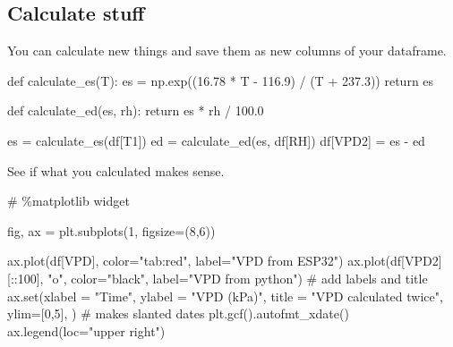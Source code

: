 \documentclass[
  letterpaper,
  DIV=11,
  numbers=noendperiod,
  oneside]{scrreprt}
\newenvironment{Shaded}{\begin{snugshade}}{\end{snugshade}}
\newcommand{\BuiltInTok}[1]{\textcolor[rgb]{0.00,0.23,0.31}{#1}}
\newcommand{\CommentTok}[1]{\textcolor[rgb]{0.37,0.37,0.37}{#1}}
\newcommand{\ControlFlowTok}[1]{\textcolor[rgb]{0.00,0.23,0.31}{#1}}
\newcommand{\DecValTok}[1]{\textcolor[rgb]{0.68,0.00,0.00}{#1}}
\newcommand{\FloatTok}[1]{\textcolor[rgb]{0.68,0.00,0.00}{#1}}
\newcommand{\KeywordTok}[1]{\textcolor[rgb]{0.00,0.23,0.31}{#1}}
\newcommand{\NormalTok}[1]{\textcolor[rgb]{0.00,0.23,0.31}{#1}}
\newcommand{\OperatorTok}[1]{\textcolor[rgb]{0.37,0.37,0.37}{#1}}
\newcommand{\StringTok}[1]{\textcolor[rgb]{0.13,0.47,0.30}{#1}}
\begin{document}
\hypertarget{calculate-stuff}{%
\subsection{Calculate stuff}\label{calculate-stuff}}

You can calculate new things and save them as new columns of your
dataframe.

\begin{Shaded}
\begin{Highlighting}[]
\KeywordTok{def}\NormalTok{ calculate\_es(T):}
\NormalTok{    es }\OperatorTok{=}\NormalTok{ np.exp((}\FloatTok{16.78} \OperatorTok{*}\NormalTok{ T }\OperatorTok{{-}} \FloatTok{116.9}\NormalTok{) }\OperatorTok{/}\NormalTok{ (T }\OperatorTok{+} \FloatTok{237.3}\NormalTok{))}
    \ControlFlowTok{return}\NormalTok{ es}

\KeywordTok{def}\NormalTok{ calculate\_ed(es, rh):}
    \ControlFlowTok{return}\NormalTok{ es }\OperatorTok{*}\NormalTok{ rh }\OperatorTok{/} \FloatTok{100.0}

\NormalTok{es }\OperatorTok{=}\NormalTok{ calculate\_es(df[}\StringTok{\textquotesingle{}T1\textquotesingle{}}\NormalTok{])}
\NormalTok{ed }\OperatorTok{=}\NormalTok{ calculate\_ed(es, df[}\StringTok{\textquotesingle{}RH\textquotesingle{}}\NormalTok{])}
\NormalTok{df[}\StringTok{\textquotesingle{}VPD2\textquotesingle{}}\NormalTok{] }\OperatorTok{=}\NormalTok{ es }\OperatorTok{{-}}\NormalTok{ ed}
\end{Highlighting}
\end{Shaded}

See if what you calculated makes sense.

\begin{Shaded}
\begin{Highlighting}[]
\CommentTok{\# \%matplotlib widget}

\NormalTok{fig, ax }\OperatorTok{=}\NormalTok{ plt.subplots(}\DecValTok{1}\NormalTok{, figsize}\OperatorTok{=}\NormalTok{(}\DecValTok{8}\NormalTok{,}\DecValTok{6}\NormalTok{))}

\NormalTok{ax.plot(df[}\StringTok{\textquotesingle{}VPD\textquotesingle{}}\NormalTok{], color}\OperatorTok{=}\StringTok{"tab:red"}\NormalTok{, label}\OperatorTok{=}\StringTok{"VPD from ESP32"}\NormalTok{)}
\NormalTok{ax.plot(df[}\StringTok{\textquotesingle{}VPD2\textquotesingle{}}\NormalTok{][::}\DecValTok{100}\NormalTok{], }\StringTok{"o"}\NormalTok{, color}\OperatorTok{=}\StringTok{"black"}\NormalTok{, label}\OperatorTok{=}\StringTok{"VPD from python"}\NormalTok{)}
\CommentTok{\# add labels and title}
\NormalTok{ax.}\BuiltInTok{set}\NormalTok{(xlabel }\OperatorTok{=} \StringTok{"Time"}\NormalTok{,}
\NormalTok{       ylabel }\OperatorTok{=} \StringTok{"VPD (kPa)"}\NormalTok{,}
\NormalTok{       title }\OperatorTok{=} \StringTok{"VPD calculated twice"}\NormalTok{,}
\NormalTok{       ylim}\OperatorTok{=}\NormalTok{[}\DecValTok{0}\NormalTok{,}\DecValTok{5}\NormalTok{],}
\NormalTok{       )}
\CommentTok{\# makes slanted dates}
\NormalTok{plt.gcf().autofmt\_xdate()}
\NormalTok{ax.legend(loc}\OperatorTok{=}\StringTok{"upper right"}\NormalTok{)}
\end{Highlighting}
\end{Shaded}
\end{document}
